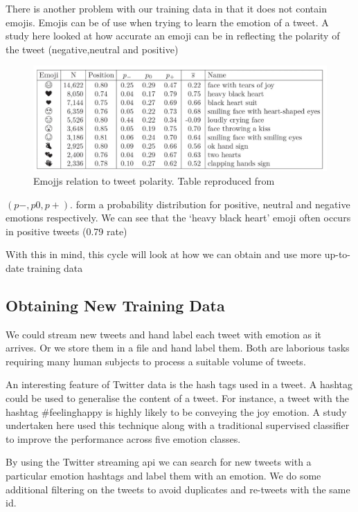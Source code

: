 There is another problem with our training data in that it does not contain emojis. Emojis can be of use when trying to learn the emotion of a tweet. A study here \cite{novak2015sentiment} looked at how accurate an emoji can be in reflecting the polarity of the tweet (negative,neutral and positive)

\begin{figure}[H]
\center
\includegraphics[width=15cm]{images/emojj_table.JPG}
\caption{Emojjs relation to tweet polarity. Table reproduced from \cite{novak2015sentiment}}
\end{figure}

$(p−, p0, p+).$ form a probability distribution for positive, neutral and negative emotions respectively. We can see that the `heavy black heart' emoji often occurs in positive tweets (0.79 rate)

With this in mind, this cycle will look at how we can obtain and use more up-to-date training data

\subsection{Obtaining New Training Data} \label{obtweets}

We could stream new tweets and hand label each tweet with emotion as it arrives. Or we store them in a file and hand label them. Both are laborious tasks requiring many human subjects to process a suitable volume of tweets.

An interesting feature of Twitter data is the hash tags used in a tweet. A hashtag could be used to generalise the content of a tweet. For instance, a tweet with the hashtag \#feelinghappy is highly likely to be conveying the joy emotion. A study undertaken here \cite{qadir2014learning} used this technique along with a traditional supervised classifier to improve the performance across five emotion classes.

By using the Twitter streaming api \cite{Twitter_Streaming_Api} we can search for new tweets with a particular emotion hashtags and label them with an emotion. We do some additional filtering on the tweets to avoid duplicates and re-tweets with the same id.

